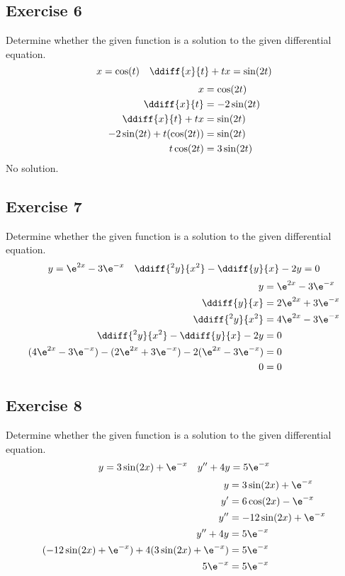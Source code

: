 \documentclass{math}
\begin{document}
\subsection*{Exercise 6}
Determine whether the given function is a solution to the given differential
equation.
\[ x = \cos(t) \quad \ddiff{x}{t}+tx = \sin(2t) \]
\begin{align*}
  x &= \cos(2t) \\
  \ddiff{x}{t} &= -2\sin(2t) \\
  \ddiff{x}{t}+tx &= \sin(2t) \\
  -2\sin(2t)+t(\cos(2t)) &= \sin(2t) \\
  t\cos(2t) &= 3\sin(2t) \\
\end{align*}
No solution.

\subsection*{Exercise 7}
Determine whether the given function is a solution to the given differential
equation.
\[ y = \e^{2x}-3\e^{-x} \quad \ddiff{^2y}{x^2}-\ddiff{y}{x}-2y = 0 \]
\begin{align*}
  y &= \e^{2x}-3\e^{-x} \\
  \ddiff{y}{x} &= 2\e^{2x}+3\e^{-x} \\
  \ddiff{^2y}{x^2} &= 4\e^{2x}-3\e^{-x} \\
  \ddiff{^2y}{x^2}-\ddiff{y}{x}-2y &= 0 \\
  (4\e^{2x}-3\e^{-x})-(2\e^{2x}+3\e^{-x})-2(\e^{2x}-3\e^{-x}) &= 0 \\
  0 &= 0
\end{align*}

\subsection*{Exercise 8}
Determine whether the given function is a solution to the given differential
equation.
\[ y = 3\sin(2x)+\e^{-x} \quad y''+4y = 5\e^{-x} \]
\begin{align*}
  y &= 3\sin(2x)+\e^{-x} \\
  y' &= 6\cos(2x)-\e^{-x} \\
  y'' &= -12\sin(2x)+\e^{-x} \\
  y''+4y &= 5\e^{-x} \\
  (-12\sin(2x)+\e^{-x})+4(3\sin(2x)+\e^{-x}) &= 5\e^{-x} \\
  5\e^{-x} &= 5\e^{-x}
\end{align*}
\end{document}
